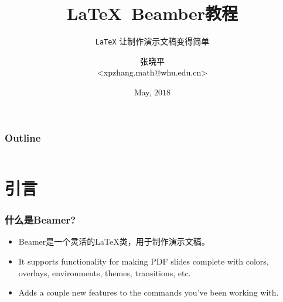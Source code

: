 \documentclass[aspectratio=1610,utf8]{beamer}
\title[Beamer教程]{\LaTeX  ~Beamber教程}
\subtitle{\texttt{\LaTeX} 让制作演示文稿变得简单}
\author[张晓平]{\scriptsize \textcolor{black}{张晓平\\ <xpzhang.math@whu.edu.cn>}}
\date{May, $2018$}
\begin{document}
\addtocounter{framenumber}{-1}


\begin{frame}
  \titlepage
\end{frame}

\begin{frame}
  \frametitle{Outline}

  \centering

  \begin{minipage}{.75\textwidth}

    \begin{columns}[t]
      \begin{column}{.5\textwidth}
        \tableofcontents[sections={1-5}]
      \end{column}
      \begin{column}{.5\textwidth}
        \tableofcontents[sections={6-10}]
      \end{column}      
    \end{columns}

  \end{minipage}

\end{frame}


\section{引言}

\begin{frame}
  \frametitle{什么是Beamer?}

  \begin{itemize}
    \setlength{\itemsep}{8pt}
    \item Beamer是一个灵活的\LaTeX{}类，用于制作演示文稿。
    \item It supports functionality for making PDF slides complete with colors, overlays, environments, themes, transitions, etc.
    \item Adds a couple new features to the commands you've been working with.
  \end{itemize}
  
\end{frame}
\end{document}
